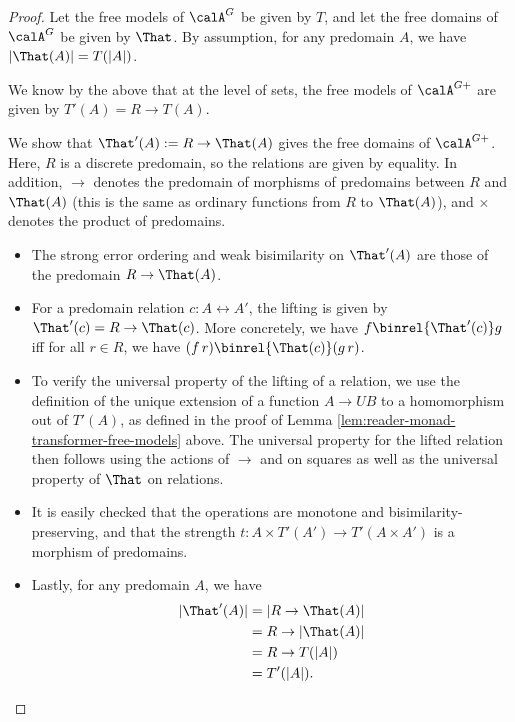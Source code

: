 \begin{proof}
    Let the free models of $\calA^G$ be given by $T$, and let the free domains
    of $\calA^G$ be given by $\That$. By assumption, for any predomain $A$, we
    have $|\That(A)| = T(|A|)$.
    
    We know by the above that at the level of sets, the free models of
    $\calA^{G+}$ are given by $T'(A) = R \to T(A)$.
    
    We show that $\That'(A) := R \to \That(A)$ gives the free domains of
    $\calA^{G+}$. Here, $R$ is a discrete predomain, so the relations are given
    by equality. In addition, $\to$ denotes the predomain of morphisms of
    predomains between $R$ and $\That(A)$ (this is the same as ordinary
    functions from $R$ to $\That(A)$), and $\times$ denotes the product of
    predomains.

    \begin{itemize}
        \item The strong error ordering and weak bisimilarity on $\That'(A)$ are
        those of the predomain $R \to \That(A)$.

        \item For a predomain relation $c : A \rel A'$, the lifting is given by
        $\That'(c) = R \to \That(c)$.
        More concretely, we have $f \binrel{\That'(c)} g$ iff for all $r \in R$,
        we have $(f\, r) \binrel{\That(c)} (g\, r)$.

        \item To verify the universal property of the lifting of a relation, we
        use the definition of the unique extension of a function $A \to UB$ to a
        homomorphism out of $T'(A)$, as defined in the proof of Lemma
        \ref{lem:reader-monad-transformer-free-models} above. The universal
        property for the lifted relation then follows using the actions of $\to$
        and on squares as well as the universal property of $\That$ on
        relations.

        \item It is easily checked that the operations are monotone and
        bisimilarity-preserving, and that the strength $t : A \times T'(A') \to
        T'(A \times A')$ is a morphism of predomains.
        
        \item Lastly, for any predomain $A$, we have
        \begin{align*}
            |\That'(A)| &= |R \to \That(A)| \\
                        &= R \to |\That(A)| \\
                        &= R \to T(|A|)  \\
                        &= T'(|A|).
        \end{align*}
    \end{itemize}
\end{proof}

